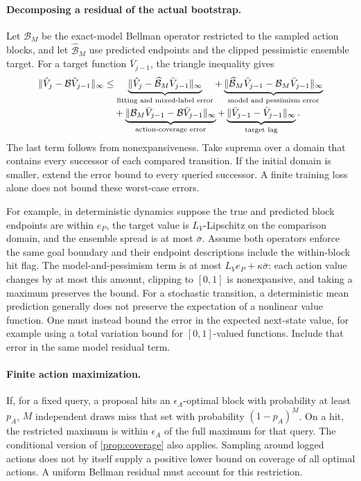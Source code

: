 \documentclass{article} %
\theoremstyle{definition}
\theoremstyle{remark}
\begin{document}
\paragraph{Decomposing a residual of the actual bootstrap.}
Let $\mathcal B_M$ be the exact-model Bellman operator restricted to the sampled
action blocks, and let $\widehat{\mathcal B}_M$ use predicted endpoints and the
clipped pessimistic ensemble target. For a target function $\bar V_{j-1}$,
the triangle inequality gives
\begin{align}
 \|\hat V_j-\mathcal B\hat V_{j-1}\|_\infty
 &\le
 \underbrace{\|\hat V_j-\widehat{\mathcal B}_M\bar V_{j-1}\|_\infty}_{\text{fitting and mixed-label error}}
 +\underbrace{\|\widehat{\mathcal B}_M\bar V_{j-1}
                  -\mathcal B_M\bar V_{j-1}\|_\infty}_{\text{model and pessimism error}}
 \notag\\[-2pt]
 &\quad+
 \underbrace{\|\mathcal B_M\bar V_{j-1}
                  -\mathcal B\bar V_{j-1}\|_\infty}_{\text{action-coverage error}}
 +\underbrace{\|\bar V_{j-1}-\hat V_{j-1}\|_\infty}_{\text{target lag}} .
 \label{eq:residual-decomposition}
\end{align}
The last term follows from nonexpansiveness.
Take suprema over a domain that contains every successor of each compared transition.
If the initial domain is smaller, extend the error bound to every queried successor.
A finite training loss alone does not bound these worst-case errors.

For example, in deterministic dynamics suppose the true and predicted block endpoints
are within $e_P$, the target value is $L_V$-Lipschitz on the comparison domain, and the
ensemble spread is at most $\bar\sigma$. Assume both operators enforce the same
goal boundary and their endpoint descriptions include the within-block hit flag.
The model-and-pessimism term is at most
$L_Ve_P+\kappa\bar\sigma$: each action value changes by at most this amount,
clipping to $[0,1]$ is nonexpansive, and taking a maximum preserves the bound.
For a stochastic transition, a deterministic mean prediction generally does not
preserve the expectation of a nonlinear value function.
One must instead bound the error in the expected next-state value, for example using
a total variation bound for $[0,1]$-valued functions. Include that error in the same
model residual term.

\paragraph{Finite action maximization.}
If, for a fixed query, a proposal hits an $\epsilon_A$-optimal block with probability
at least $p_A$, $M$ independent draws miss that set with probability
$(1-p_A)^M$. On a hit, the restricted maximum is within $\epsilon_A$ of the full
maximum for that query. The conditional version of \cref{prop:coverage} also applies.
Sampling around logged actions does not by itself supply a positive lower bound on
coverage of all optimal actions. A uniform Bellman residual must account for this
restriction.
\end{document}
